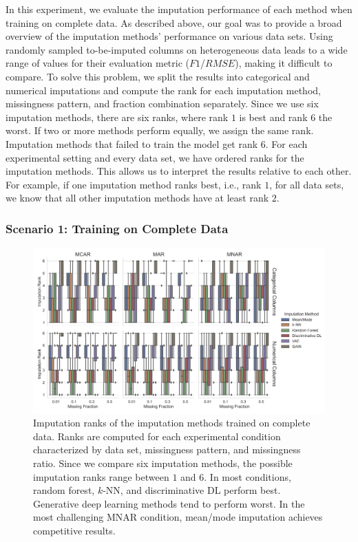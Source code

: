 \documentclass[utf8]{frontiersSCNS} %
\begin{document}
In this experiment, we evaluate the imputation performance of each method when training on complete data. As described above, our goal was to provide a broad overview of the imputation methods' performance on various data sets. Using randomly sampled to-be-imputed columns on heterogeneous data leads to a wide range of values for their evaluation metric ($F1$/$RMSE$), making it difficult to compare. To solve this problem, we split the results into categorical and numerical imputations and compute the rank for each imputation method, missingness pattern, and fraction combination separately. Since we use six imputation methods, there are six ranks, where rank $1$ is best and rank $6$ the worst. If two or more methods perform equally, we assign the same rank. Imputation methods that failed to train the model get rank $6$.
For each experimental setting and every data set, we have ordered ranks for the imputation methods. This allows us to interpret the results relative to each other. For example, if one imputation method ranks best, i.e., rank $1$, for all data sets, we know that all other imputation methods have at least rank $2$.



\subsubsection{Scenario 1: Training on Complete Data}
\label{sec:results_experiment1_scenario1}

\begin{figure}\centering
	\includegraphics[width=1\columnwidth]{fully_observed_impute_rank_boxplot}
	\caption{Imputation ranks of the  imputation methods trained on complete data. Ranks are computed for each experimental condition characterized by data set, missingness pattern, and missingness ratio. Since we compare six imputation methods, the possible imputation ranks range between $1$ and $6$. In most conditions, random forest, $k$-NN, and discriminative DL perform best. Generative deep learning methods tend to perform worst. In the most challenging MNAR condition, mean/mode imputation achieves competitive results.
	}
	\label{fig:fully_observed_impute_rank_boxplot}
\end{figure}
\end{document}
